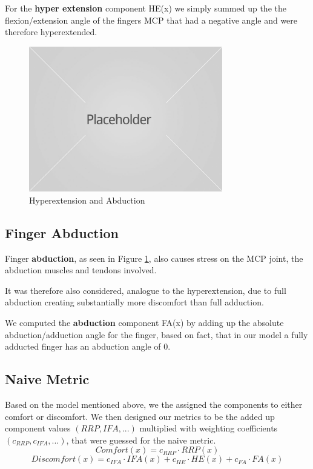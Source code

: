 \documentclass{sig-alternate-05-2015}
\begin{document}
For the \textbf{hyper extension} component HE(x) we simply summed up the the flexion/extension angle of the fingers MCP that had a negative angle and were therefore hyperextended.

\begin{figure}
\centering
\includegraphics[width=8.45cm]{placeholder1}
\vspace{-20pt}
\caption{Hyperextension and Abduction}
\label{fig:hyperabduction}
\vspace{-10pt}
\end{figure}

\subsection{Finger Abduction}

Finger \textbf{abduction}, as seen in Figure \ref{fig:hyperabduction}, 
also causes stress on the MCP joint, the abduction muscles and tendons involved.

It was therefore also considered, analogue to the hyperextension, due to full abduction creating substantially more discomfort than full adduction.

We computed the \textbf{abduction} component FA(x) by adding up the absolute abduction/adduction angle for the finger, based on fact, that in our model a fully adducted finger has an abduction angle of 0.


\subsection{Naive Metric}


Based on the model mentioned above, we the assigned the components to either comfort or discomfort. We then designed our metrics to be the added up component values \begin{math}(RRP, IFA, ...)\end{math} multiplied with weighting coefficients \begin{math}(c_{RRP}, c_{IFA}, ...)\end{math}, that were guessed for the naive metric.
	\[
	Comfort(x) = c_{RRP}\cdot RRP(x)
	\]
	\[
	Discomfort(x) = c_{IFA}\cdot IFA(x)  +  c_{HE}\cdot HE(x)  +  c_{FA}\cdot FA(x)
	\]
\end{document}

